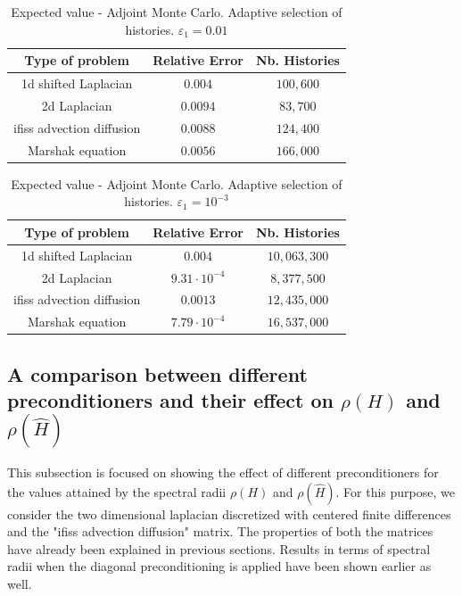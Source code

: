 \documentclass[a4paper,10pt]{article}
\begin{document}
\begin{table}[!h]
\centering
\begin{tabular}{|c|c|c|}
\hline
\textbf{Type of problem} & \textbf{Relative Error} &\textbf{Nb. Histories}\\
\hline
1d shifted Laplacian & $0.004$ & $100,600$\\
\hline 
2d Laplacian & $0.0094$ & $83,700$\\
\hline
ifiss advection diffusion & $0.0088$  & $124,400$\\
\hline
Marshak equation & $0.0056$ & $166,000$\\
\hline
\end{tabular}
\caption{Expected value - Adjoint Monte Carlo. Adaptive selection of histories. 
$\varepsilon_1=0.01$} 
\label{tab:Adj_adapt5}
\end{table}



\begin{table}[!h]
\centering
\begin{tabular}{|c|c|c|}
\hline
\textbf{Type of problem} & \textbf{Relative Error} &\textbf{Nb. Histories}\\
\hline
1d shifted Laplacian & $0.004$ & $10,063,300$\\
\hline 
2d Laplacian & $ 9.31 \cdot 10^{-4} $ & $ 8,377,500 $\\
\hline
ifiss advection diffusion & $ 0.0013 $  & $ 12,435,000 $\\
\hline
Marshak equation & $7.79 \cdot 10^{-4}$ & $16,537,000$\\
\hline
\end{tabular}
\caption{Expected value - Adjoint Monte Carlo. Adaptive selection of histories. 
$\varepsilon_1=10^{-3}$} 
\label{tab:Adj_adapt6}
\end{table}


\subsection{A comparison between different preconditioners and their effect 
on $\rho(H)$ and $\rho(\hat{H})$}

This subsection is focused on showing the effect of different preconditioners 
for the values attained by the spectral radii $\rho(H)$ and $\rho(\hat{H})$.
For this purpose, we consider the two dimensional laplacian 
discretized with centered finite differences and the "ifiss advection 
diffusion" matrix. The properties of both the matrices have already been 
explained in previous sections.
Results in terms of spectral radii when the diagonal preconditioning is applied 
have been shown earlier as well. 
\end{document}
